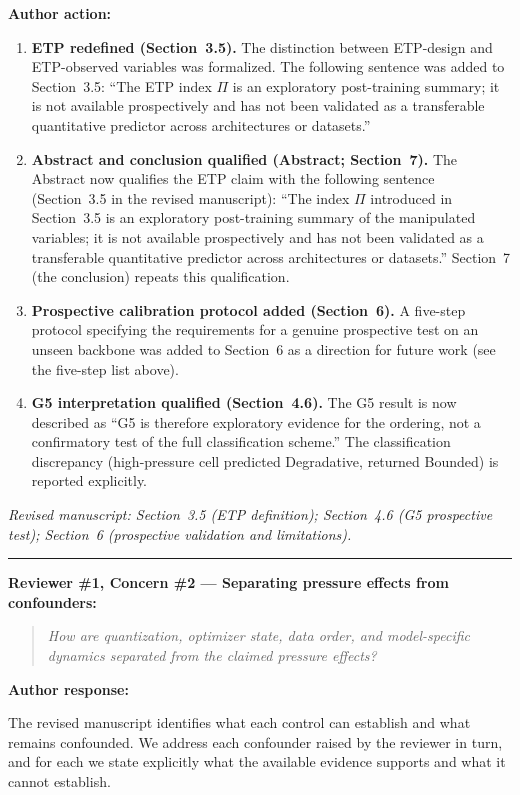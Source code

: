 \documentclass[11pt,a4paper]{article}
\newcommand{\rconcern}[3]{%
  \bigskip\noindent\rule{\linewidth}{0.4pt}\par\medskip
  \noindent\textbf{\textcolor{rccolor}{#1 --- #2:}}\par
  \smallskip
  \begin{quote}\itshape\textcolor{rccolor}{#3}\end{quote}%
}
\newcommand{\arhead}[1]{\medskip\noindent\textbf{#1}\par\smallskip}
\newcommand{\newtext}[1]{\textcolor{chgcolor}{``#1''}}
\newcommand{\msloc}[1]{%
  \smallskip\noindent\textit{Revised manuscript: #1}\par%
}
\begin{document}
\arhead{Author action:}
\begin{enumerate}[leftmargin=1.4em,itemsep=0.3em]
\item \textbf{ETP redefined (Section~3.5).}
      The distinction between ETP-design and ETP-observed variables was
      formalized. The following sentence was added to Section~3.5:
      \newtext{The ETP index $\Pi$ is an exploratory post-training
      summary; it is not available prospectively and has not been
      validated as a transferable quantitative predictor across
      architectures or datasets.}
\item \textbf{Abstract and conclusion qualified (Abstract;
      Section~7).}
      The Abstract now qualifies the ETP claim with the following sentence
      (Section~3.5 in the revised manuscript):
      \newtext{The index $\Pi$ introduced in Section~3.5
      is an exploratory post-training summary of the manipulated
      variables; it is not available prospectively and has not been
      validated as a transferable quantitative predictor across
      architectures or datasets.} Section~7 (the conclusion) repeats
      this qualification.
\item \textbf{Prospective calibration protocol added (Section~6).}
      A five-step protocol specifying the requirements for a genuine
      prospective test on an unseen backbone was added to Section~6 as
      a direction for future work (see the five-step list above).
\item \textbf{G5 interpretation qualified (Section~4.6).}
      The G5 result is now described as \newtext{G5 is therefore exploratory evidence for the ordering, not a confirmatory test of the full classification scheme.} The classification discrepancy
      (high-pressure cell predicted Degradative, returned Bounded) is
      reported explicitly.
\end{enumerate}

\msloc{Section~3.5 (ETP definition); Section~4.6 (G5 prospective test); Section~6
(prospective validation and limitations).}

\rconcern{Reviewer \#1, Concern \#2}{Separating pressure effects from confounders}{How are quantization, optimizer state, data order, and model-specific dynamics separated from the claimed pressure effects?}

\arhead{Author response:}

The revised manuscript identifies what each control can establish and what
remains confounded. We address each confounder raised by the reviewer
in turn, and for each we state explicitly what the available evidence
supports and what it cannot establish.
\end{document}
